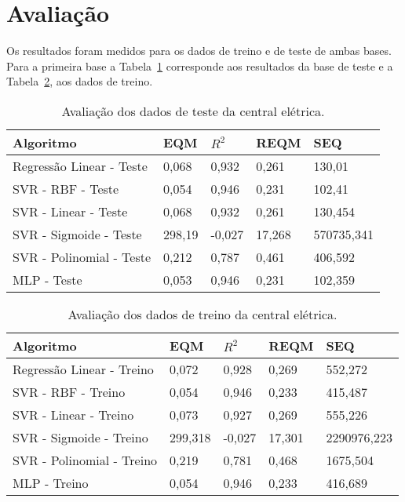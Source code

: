 \section{Avaliação}

Os resultados foram medidos para os dados de treino e de teste de ambas bases. Para a primeira base a Tabela~\ref{ceteste} corresponde aos resultados da base de teste e a Tabela~\ref{cetreino}, aos dados de treino.

\begin{table}[h]
	\centering
	\begin{tabular}{|l|l|l|l|l|}
		\hline
		Algoritmo                & EQM    & $R^2$     & REQM   & SEQ        \\ \hline
		Regressão Linear - Teste & 0,068  & 0,932  & 0,261  & 130,01     \\ \hline
		SVR - RBF - Teste        & 0,054  & 0,946  & 0,231  & 102,41     \\ \hline
		SVR - Linear - Teste     & 0,068  & 0,932  & 0,261  & 130,454    \\ \hline
		SVR - Sigmoide - Teste   & 298,19 & -0,027 & 17,268 & 570735,341 \\ \hline
		SVR - Polinomial - Teste & 0,212  & 0,787  & 0,461  & 406,592    \\ \hline
		MLP - Teste              & 0,053  & 0,946  & 0,231  & 102,359    \\ \hline
	\end{tabular}
	\caption{Avaliação dos dados de teste da central elétrica.}
\label{ceteste}
\end{table}


\begin{table}[h]
	\centering
	\begin{tabular}{|l|l|l|l|l|}
		\hline
		Algoritmo                 & EQM     & $R^2$     & REQM   & SEQ         \\ \hline
		Regressão Linear - Treino & 0,072   & 0,928  & 0,269  & 552,272     \\ \hline
		SVR - RBF - Treino        & 0,054   & 0,946  & 0,233  & 415,487     \\ \hline
		SVR - Linear - Treino     & 0,073   & 0,927  & 0,269  & 555,226     \\ \hline
		SVR - Sigmoide - Treino   & 299,318 & -0,027 & 17,301 & 2290976,223 \\ \hline
		SVR - Polinomial - Treino & 0,219   & 0,781  & 0,468  & 1675,504    \\ \hline
		MLP - Treino              & 0,054   & 0,946  & 0,233  & 416,689     \\ \hline
	\end{tabular}
	\caption{Avaliação dos dados de treino da central elétrica.}
	\label{cetreino}
\end{table}

